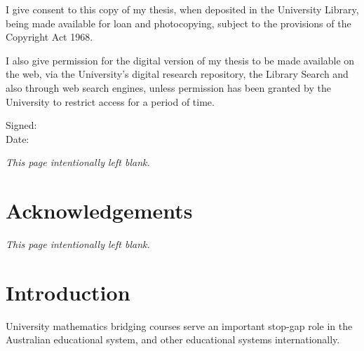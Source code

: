 \documentclass[twoside,12pt,a4paper]{report}
\makeatletter
\newcommand*{\intentionallyblankpage}{
  \vspace*{\fill}
  {\centering \textit{This page intentionally left blank.} \par}
  \vspace{\fill}}
\renewcommand*{\cleardoublepage}{\clearpage\if@twoside \ifodd\c@page\else
  \intentionallyblankpage
  \newpage
  \if@twocolumn\hbox{}\newpage\fi\fi\fi}
\makeatother
\begin{document}
I give consent to this copy of my thesis, when 
deposited in the University Library, being made 
available for loan and photocopying, subject to the 
provisions of the Copyright Act 1968.

I also give permission for the digital version of my 
thesis to be made available on the web, via the 
University's digital research repository, the Library 
Search and also through web search engines, unless 
permission has been granted by the University to 
restrict access for a period of time.


\vspace{2cm}

\begin{flushleft}
Signed:  \\[15 pt]
Date:
\end{flushleft}




\cleardoublepage
\chapter*{Acknowledgements}

\lipsum[2-4]





\glsresetall
\cleardoublepage
\chapter{Introduction}
\label{chap:intro}


University mathematics bridging courses serve an important stop-gap role in the Australian educational system, and other educational systems internationally.
\end{document}
